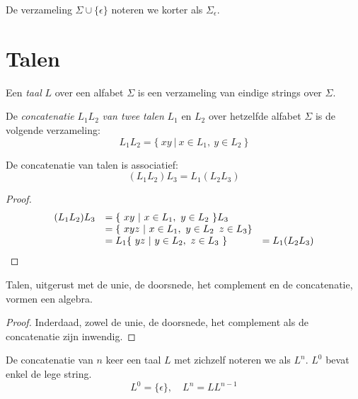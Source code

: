 \documentclass[main.tex]{subfiles}
\begin{document}
\begin{de}
  De verzameling $\Sigma \cup \{\epsilon\}$ noteren we korter als $\Sigma_{\epsilon}$.
\end{de}

\section{Talen}
\label{sec:talen}

\begin{de}
  Een \emph{taal} $L$ over een alfabet $\Sigma$ is een verzameling van eindige strings over $\Sigma$.
\end{de}

\begin{de}
  De \emph{concatenatie} $L_1L_2$ \emph{van twee talen} $L_1$ en $L_2$ over hetzelfde alfabet $\Sigma$ is de volgende verzameling:
  \[
  L_1L_2 = \{\ xy\ |\ x \in L_1,\ y \in L_2\ \} 
  \]
\end{de}

\begin{ei}
  De concatenatie van talen is associatief:
  \[
  (L_1L_2)L_3 = L_1(L_2L_3)
  \]
  \begin{proof}
    \[
    \begin{array}{r l l}
      (L_1L_2)L_3 &= \{\ xy\ |\ x \in L_1,\ y \in L_2\ \}L_3 &\\
                 &= \{\ xyz\ |\ x \in L_1,\ y \in L_2\,\ z \in L_3\} &\\
                 &= L_1\{\ yz\ |\ y \in L_2,\ z \in L_3\ \} &= L_1(L_2L_3)
    \end{array}
    \]
  \end{proof}
\end{ei}

\begin{ei}
  Talen, uitgerust met de unie, de doorsnede, het complement en de concatenatie, vormen een algebra.
  \begin{proof}
    Inderdaad, zowel de unie, de doorsnede, het complement als de concatenatie zijn inwendig. 
  \end{proof}
\end{ei}

\begin{de}
  De concatenatie van $n$ keer een taal $L$ met zichzelf noteren we als $L^n$.
  $L^0$ bevat enkel de lege string.
  \[
  L^0 = \{\epsilon\},\quad L^{n} = LL^{n-1}
  \]
\end{de}
\end{document}
